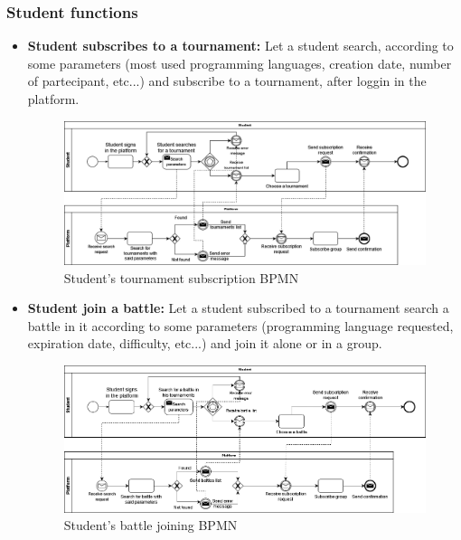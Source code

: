 \documentclass{article}
\begin{document}
{    \subsubsection{Student functions}
        \begin{itemize}
            \item \textbf{Student subscribes to a tournament:} Let a student search, according to some parameters (most used programming languages, creation date, number of partecipant, etc...) and subscribe to a tournament, after loggin in the platform.
            \begin{figure}[H]
                \centering
                \hspace*{-1.85cm}\includegraphics[scale=0.4]{images/BPMN/BPMN3.png}
                \caption{Student's tournament subscription BPMN}
                \label{fig:studTournamentSubBPMN}
            \end{figure}

            \item \textbf{Student join a battle:} Let a student subscribed to a tournament search a battle in it according to some parameters (programming language requested, expiration date, difficulty, etc...) and join it alone or in a group.
            \begin{figure}[H]
                \centering
                \hspace*{-1.85cm}\includegraphics[scale=0.4]{images/BPMN/BPMN4.png}
                \caption{Student's battle joining BPMN}
                \label{fig:studBattleJoinBPMN}
            \end{figure}


\end{itemize}}
\end{document}
